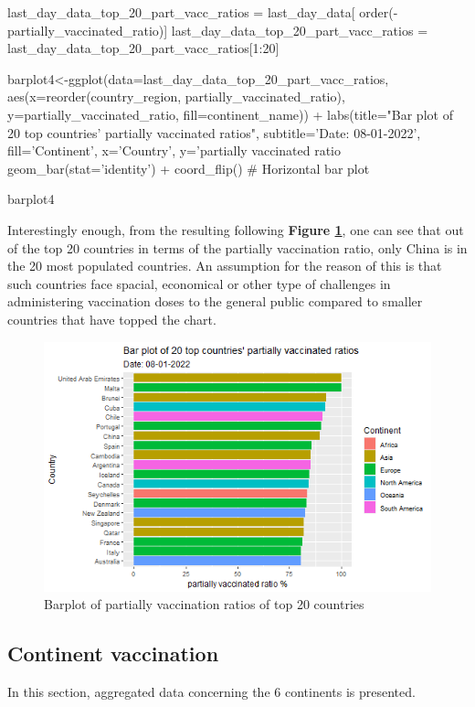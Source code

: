 \begin{Rcode}{\scriptsize}
last_day_data_top_20_part_vacc_ratios = last_day_data[
                                        order(-partially_vaccinated_ratio)]
last_day_data_top_20_part_vacc_ratios = last_day_data_top_20_part_vacc_ratios[1:20]

barplot4<-ggplot(data=last_day_data_top_20_part_vacc_ratios, 
                 aes(x=reorder(country_region, partially_vaccinated_ratio), 
                     y=partially_vaccinated_ratio, fill=continent_name)) +
  labs(title="Bar plot of 20 top countries' partially vaccinated ratios",
       subtitle='Date: 08-01-2022', fill='Continent',
       x='Country', y='partially vaccinated ratio %
  geom_bar(stat='identity') +
  coord_flip() # Horizontal bar plot

barplot4
\end{Rcode}

Interestingly enough, from the resulting following \textbf{Figure \ref{fig:top_20_ratios}}, one can see that out of the top 20 countries in terms of the partially vaccination ratio, only China is in the 20 most populated countries. An assumption for the reason of this is that such countries face spacial, economical or other type of challenges in administering vaccination doses to the general public compared to smaller countries that have topped the chart.

\begin{figure}[h]
    \centering
    \includegraphics[width=12cm]{figures/Barplot_top20_vacc_ratios.png}
    \caption{Barplot of partially vaccination ratios of top 20 countries}
    \label{fig:top_20_ratios}
\end{figure}
\FloatBarrier %

\subsection{Continent vaccination}
In this section, aggregated data concerning the 6 continents is presented.


